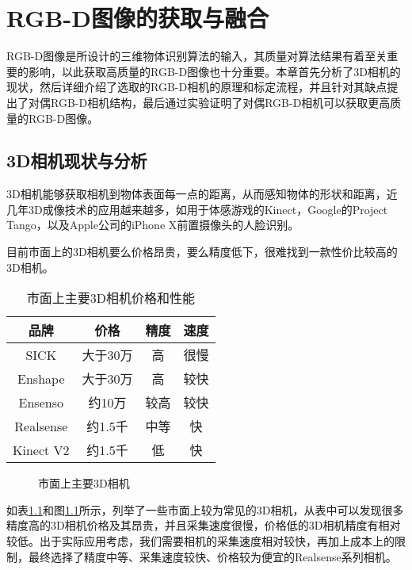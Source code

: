 \chapter{RGB-D图像的获取与融合}
\label{chap:rgbd}
RGB-D图像是所设计的三维物体识别算法的输入，其质量对算法结果有着至关重要的影响，以此获取高质量的RGB-D图像也十分重要。本章首先分析了3D相机的现状，然后详细介绍了选取的RGB-D相机的原理和标定流程，并且针对其缺点提出了对偶RGB-D相机结构，最后通过实验证明了对偶RGB-D相机可以获取更高质量的RGB-D图像。

\section{3D相机现状与分析}
3D相机能够获取相机到物体表面每一点的距离，从而感知物体的形状和距离，近几年3D成像技术的应用越来越多，如用于体感游戏的Kinect\cite{kinect}，Google的Project Tango\cite{tango}，以及Apple公司的iPhone X前置摄像头的人脸识别。

目前市面上的3D相机要么价格昂贵，要么精度低下，很难找到一款性价比较高的3D相机。
\begin{table}[ht]
  \centering
  \begin{tabular}{cccc}
    \toprule
    品牌&价格&精度&速度 \\
    \midrule
    SICK&大于30万&高&很慢 \\
    Enshape&大于30万&高&较快 \\
    Ensenso&约10万&较高&较快 \\
    Realsense&约1.5千&中等&快 \\
    Kinect V2&约1.5千&低&快\\
    \bottomrule
  \end{tabular}
  \caption{市面上主要3D相机价格和性能}
  \label{tab:3d_camera}
\end{table}
\begin{figure}[ht]
  \centering
  \caption{市面上主要3D相机}
  \label{fig:3d_camera}
\end{figure}
如表\ref{tab:3d_camera}和图\ref{fig:3d_camera}所示，列举了一些市面上较为常见的3D相机，从表中可以发现很多精度高的3D相机价格及其昂贵，并且采集速度很慢，价格低的3D相机精度有相对较低。出于实际应用考虑，我们需要相机的采集速度相对较快，再加上成本上的限制，最终选择了精度中等、采集速度较快、价格较为便宜的Realsense系列相机。



